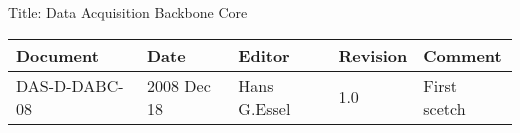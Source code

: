 Title: Data Acquisition Backbone Core
\begin{table}[h]
\begin{tabular}{|p{2.8cm}|p{2.0cm}|p{3.0cm}|p{1.6cm}|p{5.0cm}|} \hline
Document   & Date        & Editor       & Revision & Comment \\
\hline DAS-D-DABC-08 & 2008 Dec 18 & Hans G.Essel & 1.0      &
First scetch \\ \hline
\end{tabular}
\end{table}
